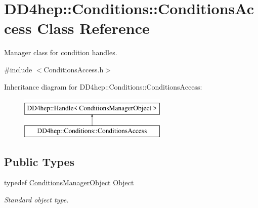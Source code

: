 \hypertarget{class_d_d4hep_1_1_conditions_1_1_conditions_access}{}\section{D\+D4hep\+:\+:Conditions\+:\+:Conditions\+Access Class Reference}
\label{class_d_d4hep_1_1_conditions_1_1_conditions_access}


Manager class for condition handles.  




{\ttfamily \#include $<$Conditions\+Access.\+h$>$}

Inheritance diagram for D\+D4hep\+:\+:Conditions\+:\+:Conditions\+Access\+:\begin{figure}[H]
\begin{center}
\leavevmode
\includegraphics[height=2.000000cm]{class_d_d4hep_1_1_conditions_1_1_conditions_access}
\end{center}
\end{figure}
\subsection*{Public Types}
\begin{DoxyCompactItemize}
\item 
typedef \hyperlink{class_d_d4hep_1_1_conditions_1_1_conditions_manager_object}{Conditions\+Manager\+Object} \hyperlink{class_d_d4hep_1_1_conditions_1_1_conditions_access_a5d82a416d51349abaf6075b2028faecc}{Object}
\begin{DoxyCompactList}\small\item\em Standard object type. \end{DoxyCompactList}\end{DoxyCompactItemize}
